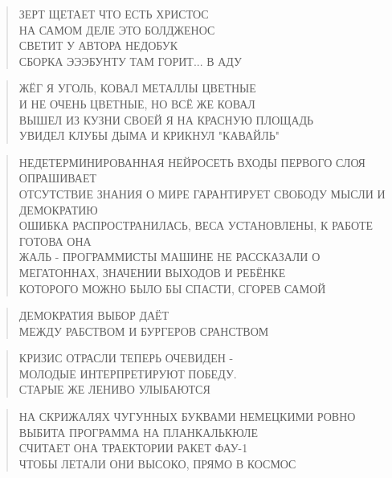 \poemtitle{***}
\begin{verse}
ЗЕРТ ЩЕТАЕТ ЧТО ЕСТЬ ХРИСТОС\\
НА САМОМ ДЕЛЕ ЭТО БОЛДЖЕНОС\\
СВЕТИТ У АВТОРА НЕДОБУК\\
СБОРКА ЭЭЭБУНТУ ТАМ ГОРИТ... В АДУ
\end{verse}

\poemtitle{***}
\begin{verse}
ЖЁГ Я УГОЛЬ, КОВАЛ МЕТАЛЛЫ ЦВЕТНЫЕ\\
И НЕ ОЧЕНЬ ЦВЕТНЫЕ, НО ВСЁ ЖЕ КОВАЛ\\
ВЫШЕЛ ИЗ КУЗНИ СВОЕЙ Я НА КРАСНУЮ ПЛОЩАДЬ\\
УВИДЕЛ КЛУБЫ ДЫМА И КРИКНУЛ "КАВАЙЛЬ"
\end{verse}

\poemtitle{***}
\begin{verse}
НЕДЕТЕРМИНИРОВАННАЯ НЕЙРОСЕТЬ ВХОДЫ ПЕРВОГО СЛОЯ ОПРАШИВАЕТ\\
ОТСУТСТВИЕ ЗНАНИЯ О МИРЕ ГАРАНТИРУЕТ СВОБОДУ МЫСЛИ И ДЕМОКРАТИЮ\\
ОШИБКА РАСПРОСТРАНИЛАСЬ, ВЕСА УСТАНОВЛЕНЫ, К РАБОТЕ ГОТОВА ОНА\\
ЖАЛЬ - ПРОГРАММИСТЫ МАШИНЕ НЕ РАССКАЗАЛИ О МЕГАТОННАХ, ЗНАЧЕНИИ ВЫХОДОВ И РЕБЁНКЕ\\
КОТОРОГО МОЖНО БЫЛО БЫ СПАСТИ, СГОРЕВ САМОЙ
\end{verse}

\poemtitle{***}
\begin{verse}
ДЕМОКРАТИЯ ВЫБОР ДАЁТ\\
МЕЖДУ РАБСТВОМ И БУРГЕРОВ СРАНСТВОМ
\end{verse}

\poemtitle{***}
\begin{verse}
КРИЗИС ОТРАСЛИ ТЕПЕРЬ ОЧЕВИДЕН -\\
МОЛОДЫЕ ИНТЕРПРЕТИРУЮТ ПОБЕДУ.\\
СТАРЫЕ ЖЕ ЛЕНИВО УЛЫБАЮТСЯ
\end{verse}

\poemtitle{***}
\begin{verse}
НА СКРИЖАЛЯХ ЧУГУННЫХ БУКВАМИ НЕМЕЦКИМИ РОВНО\\
ВЫБИТА ПРОГРАММА НА ПЛАНКАЛЬКЮЛЕ\\
СЧИТАЕТ ОНА ТРАЕКТОРИИ РАКЕТ ФАУ-1\\
ЧТОБЫ ЛЕТАЛИ ОНИ ВЫСОКО, ПРЯМО В КОСМОС
\end{verse}

